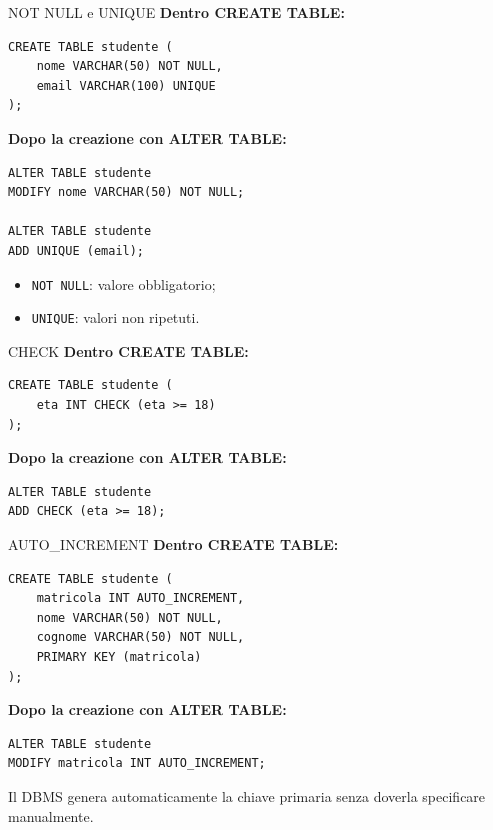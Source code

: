 \documentclass{beamer}
\begin{document}
\begin{frame}[fragile]{NOT NULL e UNIQUE}
\small
\textbf{Dentro CREATE TABLE:}
\begin{verbatim}
CREATE TABLE studente (
    nome VARCHAR(50) NOT NULL,
    email VARCHAR(100) UNIQUE
);
\end{verbatim}

\textbf{Dopo la creazione con ALTER TABLE:}
\begin{verbatim}
ALTER TABLE studente
MODIFY nome VARCHAR(50) NOT NULL;

ALTER TABLE studente
ADD UNIQUE (email);
\end{verbatim}

\medskip 
\begin{itemize}
    \item \texttt{NOT NULL}: valore obbligatorio;
    \item \texttt{UNIQUE}: valori non ripetuti.
\end{itemize}
\end{frame}

\begin{frame}[fragile]{CHECK}
\small
\textbf{Dentro CREATE TABLE:}
\begin{verbatim}
CREATE TABLE studente (
    eta INT CHECK (eta >= 18)
);
\end{verbatim}

\textbf{Dopo la creazione con ALTER TABLE:}
\begin{verbatim}
ALTER TABLE studente
ADD CHECK (eta >= 18);
\end{verbatim}

\end{frame}

\begin{frame}[fragile]{AUTO\_INCREMENT}
\small
\textbf{Dentro CREATE TABLE:}
\begin{verbatim}
CREATE TABLE studente (
    matricola INT AUTO_INCREMENT,
    nome VARCHAR(50) NOT NULL,
    cognome VARCHAR(50) NOT NULL,
    PRIMARY KEY (matricola)
);
\end{verbatim}

\textbf{Dopo la creazione con ALTER TABLE:}
\begin{verbatim}
ALTER TABLE studente
MODIFY matricola INT AUTO_INCREMENT;
\end{verbatim}

\medskip
\alert{Il DBMS genera automaticamente la chiave primaria senza doverla specificare manualmente.}
\end{frame}
\end{document}

